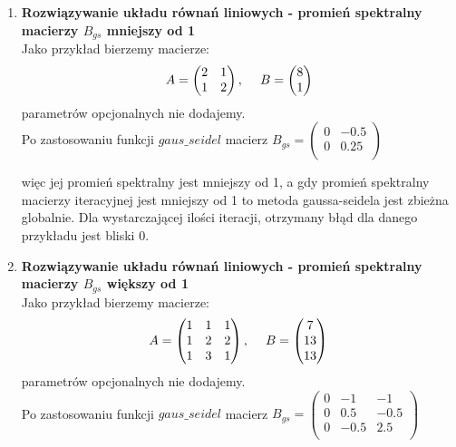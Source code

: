 \documentclass[12pt]{article}
\begin{document}
\begin{enumerate}
    \item \textbf{Rozwiązywanie układu równań liniowych - promień spektralny macierzy $B_{gs}$ mniejszy od 1}\\
    Jako przykład bierzemy macierze:
    \[
    A=\begin{pmatrix}
2 & 1 \\
1 & 2 \\
\end{pmatrix},\hskip3ex
    B=\begin{pmatrix}
8 \\
1 \\
\end{pmatrix}
    \]
    parametrów opcjonalnych nie dodajemy. \\
    Po zastosowaniu funkcji $gaus\_seidel$ macierz $B_{gs}=\begin{pmatrix}
0 & -0.5 \\
0 & 0.25 \\
\end{pmatrix}$

więc jej promień spektralny jest mniejszy od 1, a gdy promień spektralny macierzy iteracyjnej jest mniejszy od 1 to metoda gaussa-seidela jest zbieżna globalnie. Dla wystarczającej ilości iteracji, otrzymany błąd dla danego przykładu jest bliski 0.
    

    \item \textbf{Rozwiązywanie układu równań liniowych - promień spektralny macierzy $B_{gs}$ większy od 1}\\
    Jako przykład bierzemy macierze:
    \[
    A=\begin{pmatrix}
1 & 1 & 1\\
1 & 2 & 2\\
1 & 3 & 1\\
\end{pmatrix},\hskip3ex
    B=\begin{pmatrix}
7 \\
13 \\
13\\
\end{pmatrix}
    \]
    parametrów opcjonalnych nie dodajemy. \\
Po zastosowaniu funkcji $gaus\_seidel$ macierz $B_{gs}=\begin{pmatrix}
0 & -1 & -1 \\
0 & 0.5 & -0.5 \\
0 & -0.5 & 2.5 \\
\end{pmatrix}$


\end{enumerate}
\end{document}
